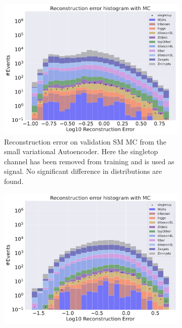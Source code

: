 \begin{figure}[h!]
    \centering
    \begin{subfigure}{.45\textwidth}
        \includegraphics[width=\textwidth]{Figures/VAE_testing/small/b_data_recon_big_rm3_feats_sig_singletop.pdf}
        \caption{Reconstruction error on validation SM MC from the small variational Autoencoder. Here the singletop channel has been removed from training and 
        is used as signal. No significant difference in distributions are found. }
        \label{fig:vae_small_singletop}
    \end{subfigure}
    \hfill
    \begin{subfigure}{.45\textwidth}
        \includegraphics[width=\textwidth]{Figures/VAE_testing/big/b_data_recon_big_rm3_feats_sig_singletop.pdf}

\end{subfigure}
\end{figure}

